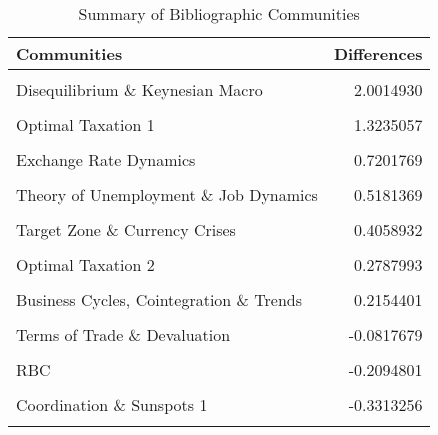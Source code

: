\documentclass[]{elsarticle} %
\begin{document}
\begin{table}[!h]

\caption{\label{tab:summary-communities}Summary of Bibliographic Communities}
\centering
\fontsize{9}{11}\selectfont
\begin{tabular}[t]{lr}
\toprule
Communities & Differences\\
\midrule
\cellcolor{gray!6}{Modeling Consumption \& Production} & \cellcolor{gray!6}{2.0986873}\\
Disequilibrium \& Keynesian Macro & 2.0014930\\
\cellcolor{gray!6}{International Macroeconomics \& Target Zone} & \cellcolor{gray!6}{1.3359739}\\
Optimal Taxation 1 & 1.3235057\\
\cellcolor{gray!6}{Political Economics of Central Banks} & \cellcolor{gray!6}{1.0265264}\\
\addlinespace
Exchange Rate Dynamics & 0.7201769\\
\cellcolor{gray!6}{Taxation, Tobin's Q \& Monetarism} & \cellcolor{gray!6}{0.6388438}\\
Theory of Unemployment \& Job Dynamics & 0.5181369\\
\cellcolor{gray!6}{Capital \& Income Taxation} & \cellcolor{gray!6}{0.4078902}\\
Target Zone \& Currency Crises & 0.4058932\\
\addlinespace
\cellcolor{gray!6}{Coordination \& Sunspots 2} & \cellcolor{gray!6}{0.3465849}\\
Optimal Taxation 2 & 0.2787993\\
\cellcolor{gray!6}{Monetary Policy, Financial Transmission \& Cycles 2} & \cellcolor{gray!6}{0.2314883}\\
Business Cycles, Cointegration \& Trends & 0.2154401\\
\cellcolor{gray!6}{Taxation, Debt \& Growth} & \cellcolor{gray!6}{-0.0067936}\\
\addlinespace
Terms of Trade \& Devaluation & -0.0817679\\
\cellcolor{gray!6}{Endogenous Growth} & \cellcolor{gray!6}{-0.1105033}\\
RBC & -0.2094801\\
\cellcolor{gray!6}{Monetary Policy, Financial Transmission \& Cycles 1} & \cellcolor{gray!6}{-0.2379855}\\
Coordination \& Sunspots 1 & -0.3313256\\
\addlinespace
\cellcolor{gray!6}{Exchange Rate Dynamics \& Expectations} & \cellcolor{gray!6}{-0.4273431}\\

\end{tabular}
\end{table}
\end{document}

